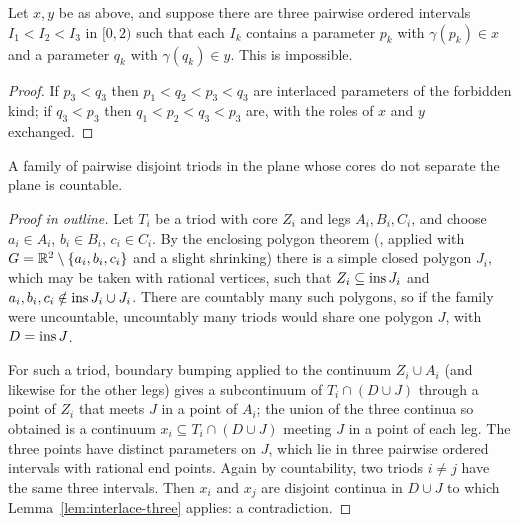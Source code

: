 
\begin{lemma}\label{lem:interlace-three}
Let $x,y$ be as above, and suppose there are three pairwise ordered intervals $I_1<I_2<I_3$ in $[0,2)$
such that each $I_k$ contains a parameter $p_k$ with $\gamma(p_k)\in x$ and a parameter $q_k$ with
$\gamma(q_k)\in y$. This is impossible.
\end{lemma}

\begin{proof}
If $p_3<q_3$ then $p_1<q_2<p_3<q_3$ are interlaced parameters of the forbidden kind; if $q_3<p_3$ then
$q_1<p_2<q_3<p_3$ are, with the roles of $x$ and $y$ exchanged.
\end{proof}


\begin{proposition}\label{prop:moore79}
A family of pairwise disjoint triods in the plane whose cores do not separate the plane is countable.
\end{proposition}

\begin{proof}[Proof in outline]
Let $T_i$ be a triod with core $Z_i$ and legs $A_i,B_i,C_i$, and choose $a_i\in A_i$, $b_i\in B_i$, $c_i\in C_i$.
By the enclosing polygon theorem (, applied with $G=\mathbb{R}^2\setminus\left\{ a_i,b_i,c_i \right\}$ and a slight
shrinking) there is a simple closed polygon $J_i$, which may be taken with rational vertices, such that
$Z_i\subseteq\operatorname{ins} J_i$ and $a_i,b_i,c_i\notin\operatorname{ins} J_i\cup J_i$. There are countably many such polygons, so if the
family were uncountable, uncountably many triods would share one polygon $J$, with $D=\operatorname{ins} J$.

For such a triod, boundary bumping applied to the continuum $Z_i\cup A_i$ (and likewise for the other legs)
gives a subcontinuum of $T_i\cap(D\cup J)$ through a point of $Z_i$ that meets $J$ in a point of $A_i$; the union
of the three continua so obtained is a continuum $x_i\subseteq T_i\cap(D\cup J)$ meeting $J$ in a point of each
leg. The three points have distinct parameters on $J$, which lie in three pairwise ordered intervals
with rational end points. Again by countability, two triods $i\neq j$ have the same three intervals.
Then $x_i$ and $x_j$ are disjoint continua in $D\cup J$ to which Lemma~\ref{lem:interlace-three} applies:
a contradiction.
\end{proof}

